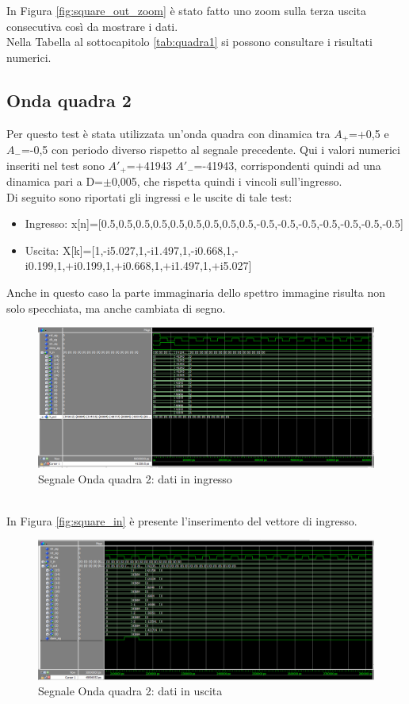 \documentclass[a4paper, titlepage]{article}
\begin{document}
In Figura \ref{fig:square_out_zoom} è stato fatto uno zoom sulla terza uscita consecutiva così da mostrare i dati.\\
Nella Tabella al sottocapitolo \ref{tab:quadra1} si possono consultare i risultati numerici.
\pagebreak
\subsection{Onda quadra 2}
Per questo test è stata utilizzata un'onda quadra con dinamica tra $A_+$=+0,5 e $A_-$=-0,5 con periodo diverso rispetto al segnale precedente. Qui i valori numerici inseriti nel test sono $A'_+$=+41943   $A'_-$=-41943, corrispondenti quindi ad una dinamica pari a D=$\pm$0,005, che rispetta quindi i vincoli sull'ingresso.\\Di seguito sono riportati gli ingressi e le uscite di tale test:
\begin{itemize}
    \item Ingresso: x[n]=[0.5,0.5,0.5,0.5,0.5,0.5,0.5,0.5,0.5,-0.5,-0.5,-0.5,-0.5,-0.5,-0.5,-0.5]
    \item Uscita:   X[k]=[1,-i5.027,1,-i1.497,1,-i0.668,1,-i0.199,1,+i0.199,1,+i0.668,1,+i1.497,1,+i5.027]
\end{itemize}
Anche in questo caso la parte immaginaria dello spettro immagine risulta non solo specchiata, ma anche cambiata di segno.
\begin{figure}[h]
    \centering
    \includegraphics[scale=0.45]{test_square2/fs_q(+5 -5)_in.png}
    \caption{Segnale Onda quadra 2: dati in ingresso}
    \label{fig:square2_in}
\end{figure}
\\In Figura \ref{fig:square_in} è presente l'inserimento del vettore di ingresso.
\begin{figure}[h]
    \centering
    \includegraphics[scale=0.45]{test_square2/fs_q(+5-5)_out.png}
    \caption{Segnale Onda quadra 2: dati in uscita}
    \label{fig:square2_out}
\end{figure}\\
\end{document}
